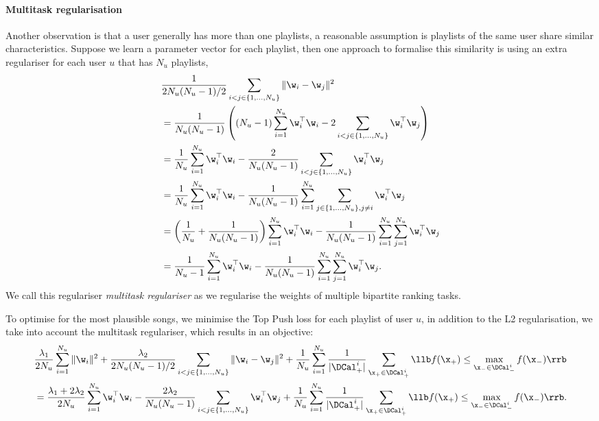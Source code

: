 \paragraph{Multitask regularisation}
Another observation is that a user generally has more than one playlists,
a reasonable assumption is playlists of the same user share similar characteristics. 
Suppose we learn a parameter vector for each playlist, then one approach to formalise this similarity is using an extra regulariser
for each user $u$ that has $N_u$ playlists,
\begin{equation}
\label{eq:mtreg}
\begin{aligned}
&\frac{1}{2 N_u (N_u - 1) / 2} \sum_{i < j \in \{1,\dots,N_u\}} \| \w_i - \w_j \|^2 \\
&= \frac{1}{N_u (N_u - 1)} \left( (N_u - 1) \sum_{i=1}^{N_u} \w_i^\top \w_i - 2 \sum_{i < j \in \{1,\dots,N_u\}} \w_i^\top \w_j \right) \\
&= \frac{1}{N_u} \sum_{i=1}^{N_u} \w_i^\top \w_i - \frac{2}{N_u (N_u - 1)} \sum_{i < j \in \{1,\dots,N_u\}} \w_i^\top \w_j \\
&= \frac{1}{N_u} \sum_{i=1}^{N_u} \w_i^\top \w_i - \frac{1}{N_u (N_u - 1)} \sum_{i=1}^{N_u} \sum_{j \in \{1,\dots,N_u\}, j \ne i} \w_i^\top \w_j \\
&= \left( \frac{1}{N_u} + \frac{1}{N_u (N_u - 1)} \right) \sum_{i=1}^{N_u} \w_i^\top \w_i 
   - \frac{1}{N_u (N_u - 1)} \sum_{i=1}^{N_u} \sum_{j=1}^{N_u} \w_i^\top \w_j \\
&= \frac{1}{N_u - 1} \sum_{i=1}^{N_u} \w_i^\top \w_i - \frac{1}{N_u (N_u - 1)} \sum_{i=1}^{N_u} \sum_{j=1}^{N_u} \w_i^\top \w_j.
\end{aligned}
\end{equation}
We call this regulariser \emph{multitask regulariser} as we regularise the weights of multiple bipartite ranking tasks. 

To optimise for the most plausible songs, we minimise the Top Push loss for each playlist of user $u$, 
in addition to the L2 regularisation, we take into account the multitask regulariser, which results in an objective:
\begin{equation}
\label{eq:mtobj}
\begin{aligned}
&\frac{\lambda_1}{2 N_u} \sum_{i=1}^{N_u} \| \w_i \|^2
+ \frac{\lambda_2}{2 N_u (N_u - 1) / 2} \sum_{i < j \in \{1,\dots,N_u\}} \| \w_i - \w_j \|^2 
+ \frac{1}{N_u} \sum_{i = 1}^{N_u} \frac{1}{|\DCal_+^i|} \sum_{\x_+ \in \DCal_+^i} \llb f(\x_+) \le \max_{\x_- \in \DCal_-^i} f(\x_-) \rrb \\
&= \frac{\lambda_1 + 2\lambda_2}{2 N_u} \sum_{i=1}^{N_u} \w_i^\top \w_i 
- \frac{2\lambda_2}{N_u (N_u - 1)} \sum_{i < j \in \{1,\dots,N_u\}} \w_i^\top \w_j
+ \frac{1}{N_u} \sum_{i = 1}^{N_u} \frac{1}{|\DCal_+^i|} \sum_{\x_+ \in \DCal_+^i} \llb f(\x_+) \le \max_{\x_- \in \DCal_-^i} f(\x_-) \rrb.
\end{aligned}
\end{equation}

